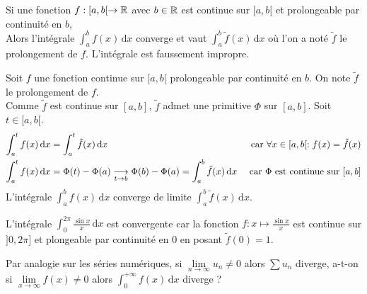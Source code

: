 \documentclass{book}
\begin{document}
\begin{Proposition}
Si une fonction $f : [a,b [\to \mathbb{R}$ avec $b \in \mathbb{R}$ est continue sur $[a,b [$ et prolongeable par continuité en $b$,\\
Alors l'intégrale $\int_{a}^{b}f(x)\,\mathrm dx$ converge et vaut $\int_{a}^{b}\tilde{f}(x)\,\mathrm dx$ où l'on a noté $\tilde{f}$ le prolongement de $f$. L'intégrale est faussement impropre.
\end{Proposition}
\begin{Demonstration}
Soit $f$ une  fonction continue sur $[a,b[$ prolongeable par continuité en $b$. On note $\tilde{f}$ le prolongement de $f$.\\
Comme $\tilde{f}$ est continue sur $[a,b]$, $\tilde{f}$ admet une primitive $\Phi$ sur $[a, b]$. Soit $t \in [a, b[$.
$$\begin{aligned}
\int_{a}^{t}f(x)\,\mathrm dx&=\int_{a}^{t}\tilde{f}(x)\,\mathrm dx& \text{ car }\forall x \in [a,b[:f(x)=\tilde{f}(x)\\
\int_{a}^{t}f(x)\,\mathrm dx&=\Phi(t)- \Phi(a)\tend[t\to b ]\Phi(b)- \Phi(a)=\int_{a}^{b}\tilde{f}(x)\,\mathrm dx &\text{ car }\Phi  \text{ est continue sur }[a,b]\\
\end{aligned}$$
L'intégrale  $\int_{a}^{b}f(x)\,\mathrm dx$ converge de limite  $\int_{a}^{b}\tilde{f}(x)\,\mathrm dx$.
\end{Demonstration}
\begin{Exemple}
L'intégrale $\int_{0}^{2\pi}\frac{\sin x}{x}\,\mathrm dx$ est convergente car la fonction $f:x\mapsto\frac{\sin x}{x}$ est continue sur $]0,2\pi]$ et plongeable par continuité en 0 en posant $\tilde{f}(0)=1$. 
\begin{center}
\end{center}
\end{Exemple}
Par analogie sur les séries numériques, si  $\lim\limits_{n\to \infty}u_n \neq 0$ alors $\sum u_n$ diverge, a-t-on
si $\lim\limits_{x\to \infty}f(x)\neq 0$  alors  $\int_{0}^{+\infty}f(x)\,\mathrm dx$ diverge ?\\
\end{document}
